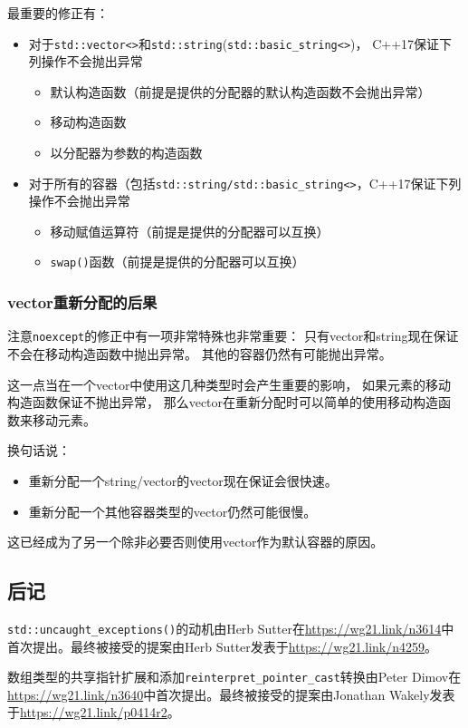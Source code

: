 最重要的修正有：
\begin{itemize}
    \item 对于\texttt{std::vector<>}和\texttt{std::string}(\texttt{std::basic\_string<>})，
    C++17保证下列操作不会抛出异常
    \begin{itemize}
        \item 默认构造函数（前提是提供的分配器的默认构造函数不会抛出异常）
        \item 移动构造函数
        \item 以分配器为参数的构造函数
    \end{itemize}
    \item 对于所有的容器（包括\texttt{std::string/std::basic\_string<>}，C++17保证下列操作不会抛出异常
    \begin{itemize}
        \item 移动赋值运算符（前提是提供的分配器可以互换）
        \item \texttt{swap()}函数（前提是提供的分配器可以互换）
    \end{itemize}
\end{itemize}

\subsubsection{vector重新分配的后果}
注意\texttt{noexcept}的修正中有一项非常特殊也非常重要：
只有vector和string现在保证不会在移动构造函数中抛出异常。
其他的容器仍然有可能抛出异常。

这一点当在一个vector中使用这几种类型时会产生重要的影响，
如果元素的移动构造函数保证不抛出异常，
那么vector在重新分配时可以简单的使用移动构造函数来移动元素。

换句话说：
\begin{itemize}
    \item 重新分配一个string/vector的vector现在保证会很快速。
    \item 重新分配一个其他容器类型的vector仍然可能很慢。
\end{itemize}
这已经成为了另一个除非必要否则使用vector作为默认容器的原因。

\subsection{后记}
\texttt{std::uncaught\_exceptions()}的动机由Herb Sutter在\url{https://wg21.link/n3614}中
首次提出。最终被接受的提案由Herb Sutter发表于\url{https://wg21.link/n4259}。

数组类型的共享指针扩展和添加\texttt{reinterpret\_pointer\_cast}转换由Peter Dimov在
\url{https://wg21.link/n3640}中首次提出。最终被接受的提案由Jonathan Wakely发表
于\url{https://wg21.link/p0414r2}。

